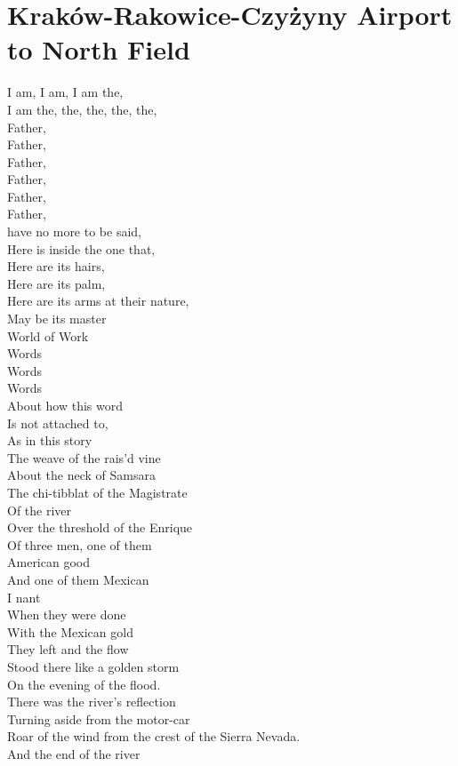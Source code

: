 \documentclass[smalldemyvopaper,11pt,twoside,onecolumn,openright,extrafontsizes]{memoir}
\begin{document}
\chapter{Kraków-Rakowice-Czyżyny Airport to North Field}
I am, I am, I am the,
\\I am the, the, the, the, the,
\\Father,
\\Father,
\\Father,
\\Father,
\\Father,
\\Father,
\\have no more to be said,
\\Here is inside the one that,
\\Here are its hairs,
\\Here are its palm,
\\Here are its arms at their nature,
\\May be its master
\\World of Work
\\Words
\\Words
\\Words
\\About how this word
\\Is not attached to,
\\As in this story
\\The weave of the rais'd vine
\\About the neck of Samsara
\\The chi-tibblat of the Magistrate
\\Of the river
\\Over the threshold of the Enrique
\\Of three men, one of them
\\American good
\\And one of them Mexican
\\I nant
\\When they were done
\\With the Mexican gold
\\They left and the flow
\\Stood there like a golden storm
\\On the evening of the flood.
\\There was the river's reflection
\\Turning aside from the motor-car
\\Roar of the wind from the crest of the Sierra Nevada.
\\And the end of the river
\end{document}
